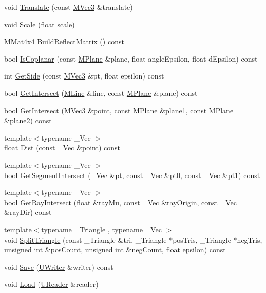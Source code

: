 \begin{CompactItemize}
\item 
void \hyperlink{class_m_plane_de0c41112fd9d1c27830edcf906d9638}{Translate} (const \hyperlink{class_m_vec3}{MVec3} \&translate)
\item 
void \hyperlink{class_m_plane_3a92f3bce040b707ba855c0f797b56d2}{Scale} (float \hyperlink{glext__bak_8h_281421b881aa7a1266842b73a3bc7655}{scale})
\item 
\hyperlink{class_m_mat4x4}{MMat4x4} \hyperlink{class_m_plane_22103668bd272f9ed1dc42f8e5a30cd2}{BuildReflectMatrix} () const 
\item 
bool \hyperlink{class_m_plane_52a97a802d2b37a8d4755735a406c217}{IsCoplanar} (const \hyperlink{class_m_plane}{MPlane} \&plane, float angleEpsilon, float dEpsilon) const 
\item 
int \hyperlink{class_m_plane_ba18afe95e49cc82c2d1f1feca4f1838}{GetSide} (const \hyperlink{class_m_vec3}{MVec3} \&pt, float epsilon) const 
\item 
bool \hyperlink{class_m_plane_c3d1fdfb5daaff1e8b48b70661c66210}{GetIntersect} (\hyperlink{class_m_line}{MLine} \&line, const \hyperlink{class_m_plane}{MPlane} \&plane) const 
\item 
bool \hyperlink{class_m_plane_e9e32981866df579c81a792bbd5e0d84}{GetIntersect} (\hyperlink{class_m_vec3}{MVec3} \&point, const \hyperlink{class_m_plane}{MPlane} \&plane1, const \hyperlink{class_m_plane}{MPlane} \&plane2) const 
\item 
{\footnotesize template$<$typename \_\-Vec $>$ }\\float \hyperlink{class_m_plane_f36d81e75e651ca9a3004e1cb14d4217}{Dist} (const \_\-Vec \&point) const 
\item 
{\footnotesize template$<$typename \_\-Vec $>$ }\\bool \hyperlink{class_m_plane_5f4124f83a2962996c6be87a5d5c92f2}{GetSegmentIntersect} (\_\-Vec \&pt, const \_\-Vec \&pt0, const \_\-Vec \&pt1) const 
\item 
{\footnotesize template$<$typename \_\-Vec $>$ }\\bool \hyperlink{class_m_plane_96c35a2efe09dbd9267d54936ed7d4ba}{GetRayIntersect} (float \&rayMu, const \_\-Vec \&rayOrigin, const \_\-Vec \&rayDir) const 
\item 
{\footnotesize template$<$typename \_\-Triangle , typename \_\-Vec $>$ }\\void \hyperlink{class_m_plane_317bf47134f27459f8235712f4149b73}{SplitTriangle} (const \_\-Triangle \&tri, \_\-Triangle $\ast$posTris, \_\-Triangle $\ast$negTris, unsigned int \&posCount, unsigned int \&negCount, float epsilon) const 
\item 
void \hyperlink{class_m_plane_67c49a180eb1c4366b074dfee7931dad}{Save} (\hyperlink{class_u_writer}{UWriter} \&writer) const 
\item 
void \hyperlink{class_m_plane_8e7c1820f2a4e745b85e011a90cfe0f8}{Load} (\hyperlink{class_u_reader}{UReader} \&reader)
\end{CompactItemize}



